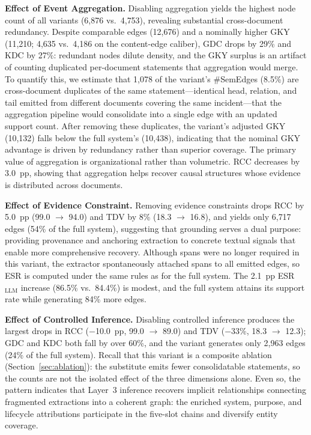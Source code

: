 \documentclass[a4paper,fleqn]{cas-dc}
\begin{document}
\textbf{Effect of Event Aggregation.}
Disabling aggregation yields the highest node count of all variants
(6{,}876 vs.\ 4{,}753), revealing substantial cross-document
redundancy.
Despite comparable edges (12{,}676) and a nominally higher GKY
(11{,}210; 4{,}635 vs.\ 4{,}186 on the content-edge caliber), GDC
drops by 29\% and KDC by 27\%: redundant nodes dilute
density, and the GKY surplus is an artifact of counting duplicated
per-document statements that aggregation would merge.
To quantify this, we estimate that 1{,}078 of the variant's
\#SemEdges (8.5\%) are cross-document duplicates of the same
statement---identical head, relation, and tail emitted from
different documents covering the same incident---that the
aggregation pipeline would consolidate into a single edge with an
updated support count.
After removing these duplicates, the variant's adjusted GKY
(10{,}132) falls below the full system's (10{,}438), indicating
that the nominal GKY advantage is driven by redundancy rather than
superior coverage.
The primary value of aggregation is organizational rather than
volumetric.
RCC decreases by 3.0~pp, showing that aggregation helps recover
causal structures whose evidence is distributed across documents.

\textbf{Effect of Evidence Constraint.}
Removing evidence constraints drops RCC by 5.0~pp (99.0 $\to$ 94.0)
and TDV by 8\% (18.3 $\to$ 16.8), and yields only 6{,}717 edges
(54\% of the full system), suggesting that grounding serves a dual
purpose: providing provenance and anchoring extraction to concrete
textual signals that enable more comprehensive recovery.
Although spans were no longer required in this variant, the extractor
spontaneously attached spans to all emitted edges, so ESR is
computed under the same rules as for the full system.
The 2.1~pp ESR$_{\text{LLM}}$ increase (86.5\% vs.\ 84.4\%) is
modest, and the full system attains its support rate while
generating 84\% more edges.

\textbf{Effect of Controlled Inference.}
Disabling controlled inference produces the largest drops in RCC
($-$10.0~pp, 99.0 $\to$ 89.0) and TDV ($-$33\%, 18.3 $\to$ 12.3);
GDC and KDC both fall by over 60\%, and the variant generates only
2{,}963 edges (24\% of the full system).
Recall that this variant is a composite ablation
(Section~\ref{sec:ablation}): the substitute emits fewer
consolidatable statements, so the counts are not the isolated
effect of the three dimensions alone.
Even so, the pattern indicates that Layer~3 inference recovers
implicit relationships connecting fragmented extractions into a
coherent graph: the enriched system, purpose, and lifecycle
attributions participate in the five-slot chains and diversify
entity coverage.
\end{document}
